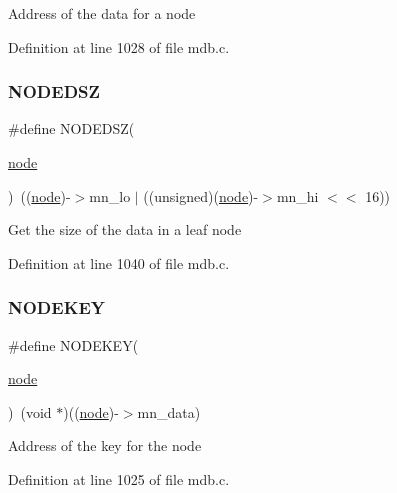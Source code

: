 Address of the data for a node 

Definition at line 1028 of file mdb.\+c.

\mbox{\label{group__internal_ga8f307b7c4ebae2194b30328bc87c4070}} 
\subsubsection{\texorpdfstring{N\+O\+D\+E\+D\+SZ}{NODEDSZ}}
{\footnotesize\ttfamily \#define N\+O\+D\+E\+D\+SZ(\begin{DoxyParamCaption}\item[{}]{\mbox{\hyperlink{structnode}{node}} }\end{DoxyParamCaption})~((\mbox{\hyperlink{structnode}{node}})-\/$>$mn\+\_\+lo $\vert$ ((unsigned)(\mbox{\hyperlink{structnode}{node}})-\/$>$mn\+\_\+hi $<$$<$ 16))}

Get the size of the data in a leaf node 

Definition at line 1040 of file mdb.\+c.

\mbox{\label{group__internal_ga0c2d3ecf490b76fd5ef32aa4082edefe}} 
\subsubsection{\texorpdfstring{N\+O\+D\+E\+K\+EY}{NODEKEY}}
{\footnotesize\ttfamily \#define N\+O\+D\+E\+K\+EY(\begin{DoxyParamCaption}\item[{}]{\mbox{\hyperlink{structnode}{node}} }\end{DoxyParamCaption})~(void $\ast$)((\mbox{\hyperlink{structnode}{node}})-\/$>$mn\+\_\+data)}

Address of the key for the node 

Definition at line 1025 of file mdb.\+c.

\mbox{\label{group__internal_gaa680cb94fd0c91a8818205fcef2d1b53}} 
